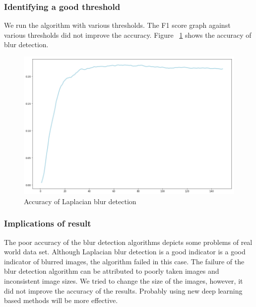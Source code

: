 \documentclass[sigconf]{acmart}
\begin{document}
\subsubsection{Identifying a good threshold} We run the algorithm with various thresholds. The F1 score graph against various thresholds did not improve the accuracy. Figure ~\ref{fig:accuracy} shows the accuracy of blur detection.
\begin{figure}[hbp]
        \centering
          
        \includegraphics[width=\columnwidth]{images/f1.png}  
        \caption{Accuracy of Laplacian blur detection } 
          \label{fig:accuracy}   
      
        
\end{figure}
\subsubsection{Implications of result} The poor accuracy of the blur detection algorithms depicts some problems of real world data set. Although Laplacian blur detection is a good indicator is a good indicator of blurred images, the algorithm failed in this case. The failure of the blur detection algorithm can be attributed to poorly taken images and inconsistent image sizes. We tried to change the size of the images, however, it did not improve the accuracy of the results. Probably using new deep learning based methods will be more effective. 
\end{document}
